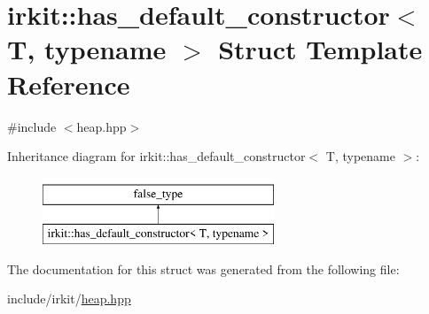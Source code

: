 \hypertarget{structirkit_1_1has__default__constructor}{}\section{irkit\+:\+:has\+\_\+default\+\_\+constructor$<$ T, typename $>$ Struct Template Reference}
\label{structirkit_1_1has__default__constructor}


{\ttfamily \#include $<$heap.\+hpp$>$}

Inheritance diagram for irkit\+:\+:has\+\_\+default\+\_\+constructor$<$ T, typename $>$\+:\begin{figure}[H]
\begin{center}
\leavevmode
\includegraphics[height=2.000000cm]{structirkit_1_1has__default__constructor}
\end{center}
\end{figure}


The documentation for this struct was generated from the following file\+:\begin{DoxyCompactItemize}
\item 
include/irkit/\hyperlink{heap_8hpp}{heap.\+hpp}\end{DoxyCompactItemize}
